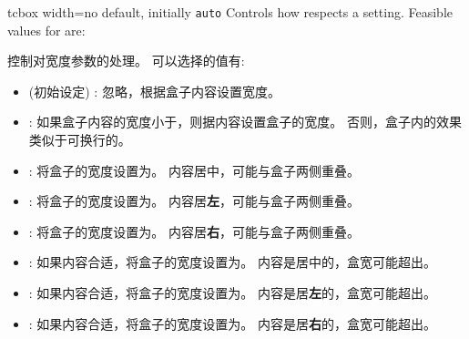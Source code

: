\begin{docTcbKey}[][doc new=2015-03-23]{tcbox width}{=}{no default, initially \texttt{auto}}
Controls how  respects a  setting.
Feasible values for  are:

控制对宽度参数的处理。%
可以选择的值有:
\begin{itemize}
\item{} 
(初始设定) :
忽略，根据盒子内容设置宽度。
\item{}:
如果盒子内容的宽度小于，则据内容设置盒子的宽度。%
否则，盒子内的效果类似于可换行的。
\item{}:
将盒子的宽度设置为。%
内容居中，可能与盒子两侧重叠。
\item{}:
将盒子的宽度设置为。%
内容居{\bf 左}，可能与盒子两侧重叠。
\item{}:
将盒子的宽度设置为。%
内容居{\bf 右}，可能与盒子两侧重叠。
\item{}:
如果内容合适，将盒子的宽度设置为。%
内容是居中的，盒宽可能超出。
\item{}:
如果内容合适，将盒子的宽度设置为。%
内容是居{\bf 左}的，盒宽可能超出。
\item{}:
如果内容合适，将盒子的宽度设置为。%
内容是居{\bf 右}的，盒宽可能超出。
\end{itemize}



\end{docTcbKey}
